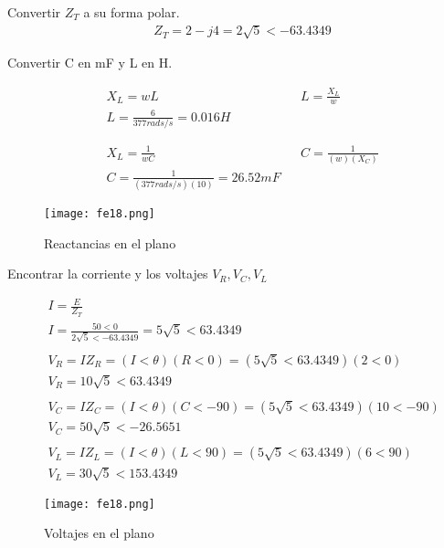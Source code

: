 \begin{enumerate}
	      Convertir $Z_T$ a su forma polar.
	      \begin{align*}
		       & Z_T=2-j4= 2\sqrt{5}<-63.4349
	      \end{align*}

	      Convertir C en mF y L en H.

	      \begin{align*}
		       & X_L=wL                              &  & L=\frac{X_L}{w}      \\
		       & L=\frac{6}{377rads/s}=0.016H                                  \\\\\\
		       & X_L=\frac{1}{wC}                    &  & C=\frac{1}{(w)(X_C)} \\
		       & C=\frac{1}{(377rads/s)(10)}=26.52mF
	      \end{align*}

	      \begin{figure}[h!]
		      \centering
		      \texttt{[image: fe18.png]}
		      \caption{Reactancias en el plano}
		      \label{f3}
	      \end{figure}

	      Encontrar la corriente y los voltajes $V_R, V_C, V_L$

	      \begin{align*}
		       & I=\frac{E}{Z_T}                                        \\
		       & I=\frac{50<0}{2\sqrt{5}<-63.4349}= 5\sqrt{5}<63.4349   \\\\\
		       & V_R=IZ_R=(I<\theta)(R<0)=(5\sqrt{5}<63.4349)(2<0)      \\
		       & V_R=10\sqrt{5}<63.4349                                 \\\\
		       & V_C=IZ_C=(I<\theta)(C<-90)=(5\sqrt{5}<63.4349)(10<-90) \\
		       & V_C=50\sqrt{5}<-26.5651                                \\\\
		       & V_L=IZ_L=(I<\theta)(L<90)=(5\sqrt{5}<63.4349)(6<90)    \\
		       & V_L=30\sqrt{5}<153.4349
	      \end{align*}

	      \begin{figure}[h!]
		      \centering
		      \texttt{[image: fe18.png]}
		      \caption{Voltajes en el plano}
		      \label{f4}
	      \end{figure}


\end{enumerate}
